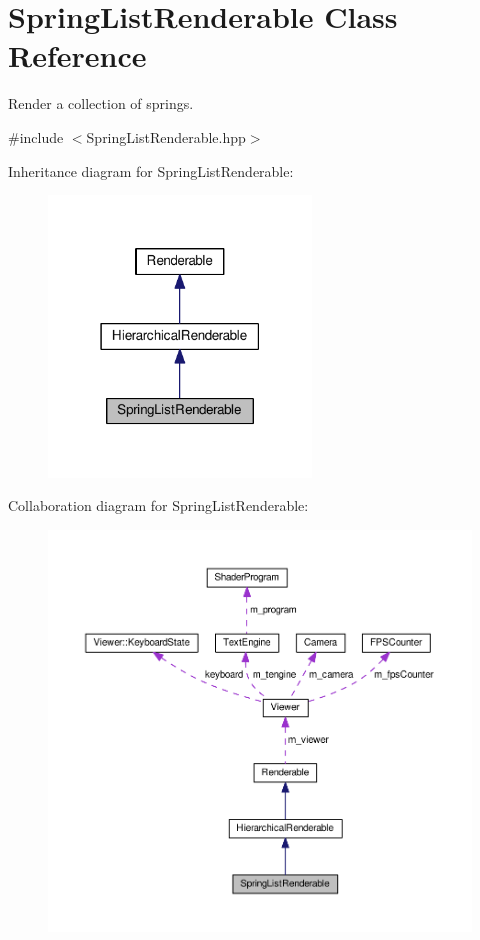 \hypertarget{classSpringListRenderable}{\section{Spring\+List\+Renderable Class Reference}
\label{classSpringListRenderable}
}


Render a collection of springs.  




{\ttfamily \#include $<$Spring\+List\+Renderable.\+hpp$>$}



Inheritance diagram for Spring\+List\+Renderable\+:\nopagebreak
\begin{figure}[H]
\begin{center}
\leavevmode
\includegraphics[width=198pt]{classSpringListRenderable__inherit__graph}
\end{center}
\end{figure}


Collaboration diagram for Spring\+List\+Renderable\+:\nopagebreak
\begin{figure}[H]
\begin{center}
\leavevmode
\includegraphics[width=350pt]{classSpringListRenderable__coll__graph}
\end{center}
\end{figure}
